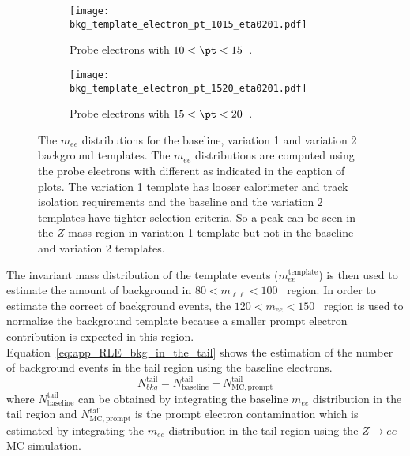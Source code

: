 \begin{figure}[htb]
    \begin{subfigure}[b]{0.48\textwidth}
        \begin{center}
            \texttt{[image: bkg\_template\_electron\_pt\_1015\_eta0201.pdf]}
            \caption{Probe electrons with $10 < \pt < 15$~{\GeV}.}
        \end{center}
    \end{subfigure}
    \begin{subfigure}[b]{0.48\textwidth}
        \begin{center}
            \texttt{[image: bkg\_template\_electron\_pt\_1520\_eta0201.pdf]}
            \caption{Probe electrons with $15 < \pt < 20$~{\GeV}.}
        \end{center}
    \end{subfigure}
    \caption{The $m_{ee}$ distributions for the baseline, variation 1 and variation 2 background templates.
    The $m_{ee}$ distributions are computed using the probe electrons with different \pt as indicated in the caption of plots.
    The variation 1 template has looser calorimeter and track isolation requirements and the baseline and the variation 2 templates have tighter selection criteria.
    So a peak can be seen in the $Z$ mass region in variation 1 template but not in the baseline and variation 2 templates.}
    \label{fig:app_RLE_bkg_templates}
\end{figure}
%
The invariant mass distribution of the template events ($m_{ee}^\mathrm{template}$) is then used to estimate the amount of background in $80 < m_{\ell \ell} < 100$~{\GeV} region.
In order to estimate the correct of background events, the $120 < m_{ee} < 150$~{\GeV} region is used to normalize the background template because a smaller prompt electron contribution is expected in this region.
Equation~\ref{eq:app_RLE_bkg_in_the_tail} shows the estimation of the number of background events in the tail region using the baseline electrons.
%
\begin{equation}
    N_{bkg}^\mathrm{tail} = N_\mathrm{baseline}^\mathrm{tail} - N_\mathrm{MC, prompt}^\mathrm{tail}
    \label{eq:app_RLE_bkg_in_the_tail}
\end{equation}
%
where $N_\mathrm{baseline}^\mathrm{tail}$ can be obtained by integrating the baseline $m_{ee}$ distribution in the tail region and $N_\mathrm{MC, prompt}^\mathrm{tail}$ is the prompt electron contamination which is estimated by integrating the $m_{ee}$ distribution in the tail region using the $Z \to ee$ MC simulation.
